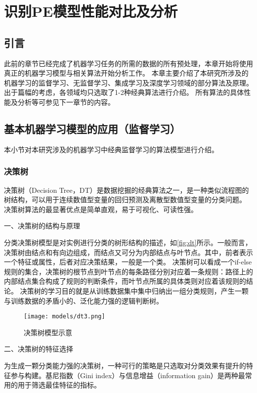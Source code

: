 \chapter{识别PE模型性能对比及分析}
\section{引言}
此前的章节已经完成了机器学习任务的所需的数据的所有预处理，本章开始将使用真正的机器学习模型与相关算法开始分析工作。
本章主要介绍了本研究所涉及的机器学习的监督学习、无监督学习、集成学习及深度学习领域的部分算法及原理。出于篇幅的考虑，各领域均只选取了1-2种经典算法进行介绍。
所有算法的具体性能及分析等可参见下一章节的内容。

\section{基本机器学习模型的应用（监督学习）}
本小节对本研究涉及的机器学习中经典监督学习的算法模型进行介绍。

\subsection{决策树}
决策树（Decision Tree，DT）是数据挖掘的经典算法之一，是一种类似流程图的树结构，可以用于连续数值型变量的回归预测及离散型数值型变量的分类问题\cite{Li2017,Liu2018}。
决策树算法的最显著优点是简单直观，易于可视化、可读性强。

一、决策树的结构与原理

分类决策树模型是对实例进行分类的树形结构的描述，如\autoref{fig:dt}所示。一般而言，决策树由结点和有向边组成，而结点又可分为内部结点与叶节点。其中，前者表示一个特征或属性，后者对应决策结果，一般是一个类\cite{Li2017,Zhou2016}。
决策树可以看成一个if-else规则的集合，决策树的根节点到叶节点的每条路径分别对应着一条规则：路径上的内部结点集合构成了规则的判断条件，而叶节点所属的具体类则对应着该规则的结论。
决策树的学习目的就是从训练数据集中集中归纳出一组分类规则，产生一颗与训练数据的矛盾小的、泛化能力强的逻辑判断树。
\begin{figure}[htbp]
    \centering
    \texttt{[image: models/dt3.png]}
    \caption{\label{fig:dt}决策树模型示意}
\end{figure}

二、决策树的特征选择

为生成一颗分类能力强的决策树，一种可行的策略是只选取对分类效果有提升的特征参与构建。基尼指数（Gini index）与信息增益（information gain）是两种最常用的用于筛选最佳特征的指标。

